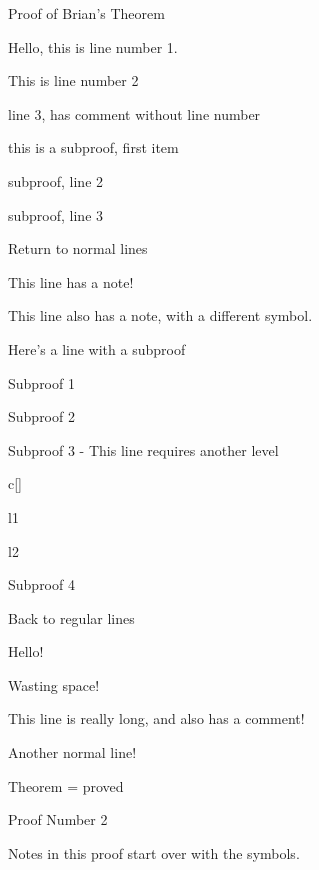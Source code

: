 \documentclass{homework}
\begin{document}
\maketitle


\begin{numproof}{Proof of Brian's Theorem}
	\item Hello, this is line number 1.
	\item This is line number 2
	\item line 3, has comment without line number 
	\begin{subproof}{3}
		\item this is a subproof, first item
		\item subproof, line 2 
		\item subproof, line 3 
	\end{subproof}
	\item Return to normal lines
	\item This line has a note! 
	\item This line also has a note, with a different symbol. 
	\item Here's a line with a subproof
		\begin{subproof}{7}
			\item Subproof 1
			\item Subproof 2
			\item Subproof 3 - This line requires another level
				\begin{subproof}{c}[\arabic*]
					\item l1
					\item l2
				\end{subproof}
			\item Subproof 4
		\end{subproof}
	\item Back to regular lines
	\item Hello!
	\item Wasting space!
	\item This line is really long, and also has a comment! \lipsum[4] 
	\item Another normal line!
	\item Theorem = proved
\end{numproof}


\newpage
\begin{numproof}{Proof Number 2}
	\item Notes in this proof start over with the symbols. 
\end{numproof}
\end{document}

